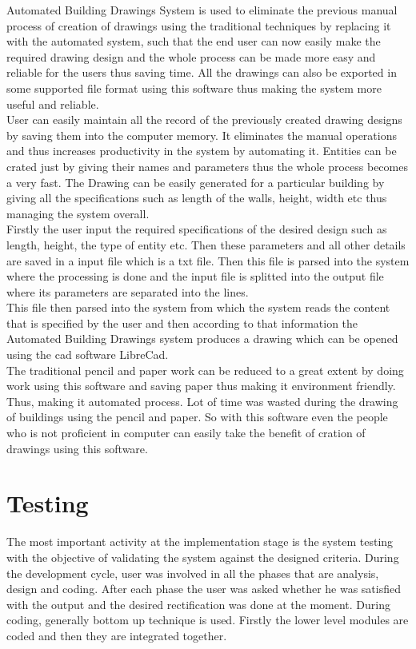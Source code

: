 \noindent Automated Building Drawings System is used to eliminate the previous manual process of creation of drawings using the traditional techniques by replacing it with the automated system, such that the end user can now easily make the required drawing design 
and the whole process can be made more easy and reliable for the users thus saving time. All the drawings can also be exported in some supported file format using this software thus making the system more useful and reliable.\\

\noindent User can easily maintain all the record of the previously created drawing designs by saving them into the computer memory. It eliminates the manual operations and thus
increases productivity in the system by automating it. Entities can be crated just by giving their names and parameters thus the whole process becomes a very fast. The Drawing can be easily generated for a particular building by giving all the specifications such as length of the walls, height, width etc thus managing the system overall. \\

\noindent Firstly the user input the required specifications of the desired design such as length, height, the type of entity etc. Then these parameters and all other details are saved in a input file which is a txt file. Then this file is parsed into the system where the processing is done and the input file is splitted into the output file where its parameters are separated into the lines. \\

\noindent This file then parsed into the system from which the system reads the content that is specified by the user and then according to that information the Automated Building Drawings system produces a drawing which can be opened using the cad software LibreCad.\\

\noindent The traditional pencil and paper work can be reduced to a great extent by doing work using this software and saving paper thus
making it environment friendly. Thus, making it automated process. Lot of time was wasted during the drawing of buildings using the pencil and paper. So with this software even the  people who is not proficient in computer can easily take the benefit of cration of drawings using this software.


\section{Testing}
The most important activity at the implementation stage is the system testing with the objective of validating the system against the designed criteria. During the development cycle, user was involved in all the phases that are analysis, design and coding. After each phase the user was asked whether he was satisfied with the output and the desired rectification was done at the moment. During coding, generally bottom up technique is used. Firstly the lower level modules are coded and then they are integrated together.

